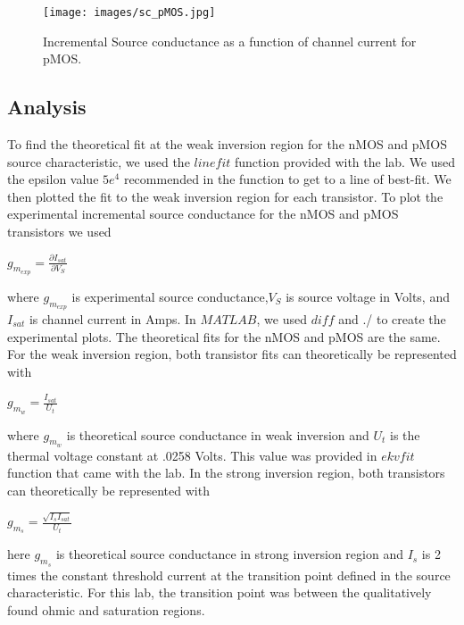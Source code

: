 \documentclass{article}
\begin{document}
\begin{figure}[H]   
  \begin{center}       
  \texttt{[image: images/sc\_pMOS.jpg]}
  \caption{Incremental Source conductance as a function of channel current for pMOS.}   
  \label{fig:p_sc}
  \end{center}
\end{figure}
\subsection{Analysis}
To find the theoretical fit at the weak inversion region for the nMOS and pMOS source characteristic, we used the $linefit$ function provided with the lab.  We used the epsilon value $5e^{4}$ recommended in the function to get to a line of best-fit.  We then plotted the fit to the weak inversion region for each transistor.
\newline
\newline
To plot the experimental incremental source conductance for the nMOS and pMOS transistors we used 
\begin{center}
 $g_{m_{exp}} = \frac{\partial I_{sat}}{\partial V_{S}}$
\end{center}
where $g_{m_{exp}}$ is experimental source conductance,$V_{S}$ is source voltage in Volts, and $I_{sat}$ is channel current in Amps.  In $MATLAB$, we used $diff$ and ./ to create the experimental plots.  The theoretical fits for the nMOS and pMOS are the same. For the weak inversion region, both transistor fits can theoretically be represented with
\begin{center}
$ g_{m_{w}} =\frac{I_{sat}}{U_{t}}$
\end{center}
where $ g_{m_{w}}$ is theoretical source conductance in weak inversion and $U_{t}$ is the thermal voltage constant at .0258 Volts.  This value was provided in $ekvfit$ function that came with the lab.  In the strong inversion region, both transistors can theoretically be represented with 
\begin{center}
$ g_{m_{s}} =\frac{\sqrt{I_{s}I_{sat}}}{U_{t}}$
\end{center}
here $ g_{m_{s}}$ is theoretical source conductance in strong inversion region and $I_{s}$ is 2 times the constant threshold current at the transition point defined in the source characteristic.  For this lab, the transition point was between the qualitatively found ohmic and saturation regions.
\end{document}
